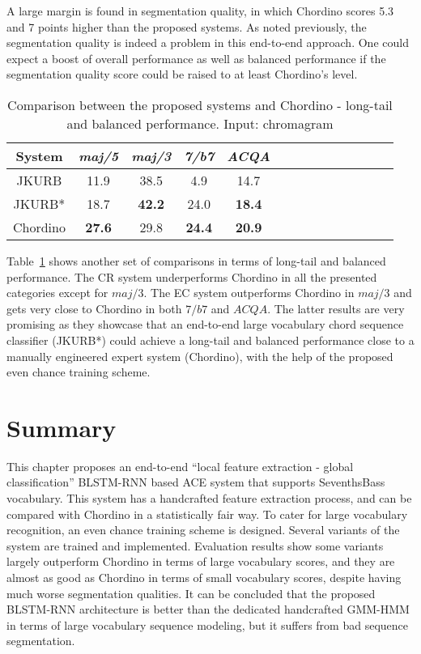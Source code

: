 A large margin is found in segmentation quality, in which Chordino scores 5.3 and 7 points higher than the proposed systems. As noted previously, the segmentation quality is indeed a problem in this end-to-end approach. One could expect a boost of overall performance as well as balanced performance if the segmentation quality score could be raised to at least Chordino's level.

\begin{table}[htb]
	\caption{Comparison between the proposed systems and Chordino - long-tail and balanced performance. Input: chromagram}
	\label{tab:4-cpcd-2}
	\centering
	\scriptsize
	\begin{tabular}{|c|c|c|c|c|c|c|c|c|c|c|c|c|c|}\hline
		System & \textit{maj/5} & \textit{maj/3} & \textit{7/b7} & \textit{ACQA} \\ \hline
		JKURB & 11.9 & 38.5 & 4.9 & 14.7\\ \hline
		JKURB* & 18.7 & \textbf{42.2} & 24.0 & \textbf{18.4}\\ \hline
		Chordino & \textbf{ 27.6} & 29.8 & \textbf{24.4} & \textbf{20.9}\\ \hline
	\end{tabular}
\end{table}
Table~\ref{tab:4-cpcd-2} shows another set of comparisons in terms of long-tail and balanced performance. The CR system underperforms Chordino in all the presented categories except for $maj/3$.	The EC system outperforms Chordino in $maj/3$ and gets very close to Chordino in both $7/b7$ and $ACQA$. The latter results are very promising as they showcase that an end-to-end large vocabulary chord sequence classifier (JKURB*) could achieve a long-tail and balanced performance close to a manually engineered expert system (Chordino), with the help of the proposed even chance training scheme.

\section{Summary}\label{sec:4-concln}
This chapter proposes an end-to-end ``local feature extraction - global classification'' BLSTM-RNN based ACE system that supports SeventhsBass vocabulary. This system has a handcrafted feature extraction process, and can be compared with Chordino in a statistically fair way. To cater for large vocabulary recognition, an even chance training scheme is designed. Several variants of the system are trained and implemented. Evaluation results show some variants largely outperform Chordino in terms of large vocabulary scores, and they are almost as good as Chordino in terms of small vocabulary scores, despite having much worse segmentation qualities. It can be concluded that the proposed BLSTM-RNN architecture is better than the dedicated handcrafted GMM-HMM in terms of large vocabulary sequence modeling, but it suffers from bad sequence segmentation.

